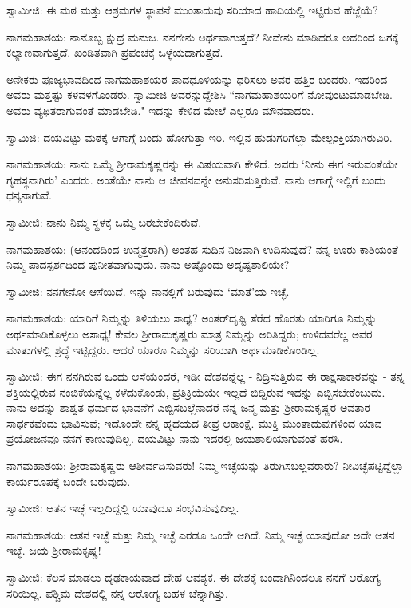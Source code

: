 ಸ್ವಾಮೀಜಿ: ಈ ಮಠ ಮತ್ತು ಆಶ್ರಮಗಳ ಸ್ಥಾಪನೆ ಮುಂತಾದುವು ಸರಿಯಾದ ಹಾದಿಯಲ್ಲಿ ಇಟ್ಟಿರುವ ಹೆಜ್ಜೆಯೆ?

ನಾಗಮಹಾಶಯ: ನಾನೊಬ್ಬ ಕ್ಷುದ್ರ ಮನುಜ. ನನಗೇನು ಅರ್ಥವಾಗುತ್ತದೆ? ನೀವೇನು ಮಾಡಿದರೂ ಅದರಿಂದ ಜಗಕ್ಕೆ ಕಲ್ಯಾಣವಾಗುತ್ತದೆ. ಖಂಡಿತವಾಗಿ ಪ್ರಪಂಚಕ್ಕೆ ಒಳ್ಳೆಯದಾಗುತ್ತದೆ.

ಅನೇಕರು ಪೂಜ್ಯಭಾವದಿಂದ ನಾಗಮಹಾಶಯರ ಪಾದಧೂಳಿಯನ್ನು ಧರಿಸಲು ಅವರ ಹತ್ತಿರ ಬಂದರು. ಇದರಿಂದ ಅವರು ಮತ್ತಷ್ಟು ಕಳವಳಗೊಂಡರು. ಸ್ವಾಮೀಜಿ ಅವರನ್ನುದ್ದೇಶಿಸಿ “ನಾಗಮಹಾಶಯರಿಗೆ ನೋವುಂಟುಮಾಡಬೇಡಿ. ಅವರು ವ್ಯಥಿತರಾಗುವಂತೆ ಮಾಡಬೇಡಿ." ಇದನ್ನು ಕೇಳಿದ ಮೇಲೆ ಎಲ್ಲರೂ ಮೌನವಾದರು.

ಸ್ವಾಮಿಜಿ: ದಯವಿಟ್ಟು ಮಠಕ್ಕೆ ಆಗಾಗ್ಗೆ ಬಂದು ಹೋಗುತ್ತಾ ಇರಿ. ಇಲ್ಲಿನ ಹುಡುಗರಿಗೆಲ್ಲಾ ಮೇಲ್ಪಂಕ್ತಿಯಾಗಿರುವಿರಿ.

ನಾಗಮಹಾಶಯ: ನಾನು ಒಮ್ಮೆ ಶ‍್ರೀರಾಮಕೃಷ್ಣರನ್ನು ಈ ವಿಷಯವಾಗಿ ಕೇಳಿದೆ. ಅವರು ‘ನೀನು ಈಗ ಇರುವಂತೆಯೇ ಗೃಹಸ್ಥನಾಗಿರು’ ಎಂದರು. ಅಂತೆಯೇ ನಾನು ಆ ಜೀವನವನ್ನೇ ಅನುಸರಿಸುತ್ತಿರುವೆ. ನಾನು ಆಗಾಗ್ಗೆ ಇಲ್ಲಿಗೆ ಬಂದು ಧನ್ಯನಾಗುವೆ.

ಸ್ವಾಮೀಜಿ: ನಾನು ನಿಮ್ಮ ಸ್ಥಳಕ್ಕೆ ಒಮ್ಮೆ ಬರಬೇಕೆಂದಿರುವೆ.

ನಾಗಮಹಾಶಯ: (ಆನಂದದಿಂದ ಉನ್ಮತ್ತರಾಗಿ) ಅಂತಹ ಸುದಿನ ನಿಜವಾಗಿ ಉದಿಸುವುದೆ? ನನ್ನ ಊರು ಕಾಶಿಯಂತೆ ನಿಮ್ಮ ಪಾದಸ್ಪರ್ಶದಿಂದ ಪುನೀತವಾಗುವುದು. ನಾನು ಅಷ್ಟೊಂದು ಅದೃಷ್ಟಶಾಲಿಯೇ?

ಸ್ವಾಮೀಜಿ: ನನಗೇನೋ ಆಸೆಯಿದೆ. ಇನ್ನು ನಾನಲ್ಲಿಗೆ ಬರುವುದು ‘ಮಾತೆ’ಯ ಇಚ್ಛೆ.

ನಾಗಮಹಾಶಯ: ಯಾರಿಗೆ ನಿಮ್ಮನ್ನು ತಿಳಿಯಲು ಸಾಧ್ಯ? ಅಂತರ್‌ದೃಷ್ಟಿ ತೆರೆದ ಹೊರತು ಯಾರಿಗೂ ನಿಮ್ಮನ್ನು ಅರ್ಥಮಾಡಿಕೊಳ್ಳಲು ಅಸಾಧ್ಯ! ಕೇವಲ ಶ‍್ರೀರಾಮಕೃಷ್ಣರು ಮಾತ್ರ ನಿಮ್ಮನ್ನು ಅರಿತಿದ್ದರು; ಉಳಿದವರೆಲ್ಲ ಅವರ ಮಾತುಗಳಲ್ಲಿ ಶ್ರದ್ಧೆ ಇಟ್ಟಿದ್ದರು. ಆದರೆ ಯಾರೂ ನಿಮ್ಮನ್ನು ಸರಿಯಾಗಿ ಅರ್ಥಮಾಡಿಕೊಂಡಿಲ್ಲ.

ಸ್ವಾಮೀಜಿ: ಈಗ ನನಗಿರುವ ಒಂದು ಆಸೆಯೆಂದರೆ, ಇಡೀ ದೇಶವನ್ನೆಲ್ಲ - ನಿದ್ರಿಸುತ್ತಿರುವ ಈ ರಾಕ್ಷಸಾಕಾರವನ್ನು - ತನ್ನ ಶಕ್ತಿಯಲ್ಲಿರುವ ನಂಬಿಕೆಯನ್ನೆಲ್ಲ ಕಳೆದುಕೊಂಡು, ಪ್ರತಿಕ್ರಿಯೆಯೇ ಇಲ್ಲದೆ ಬಿದ್ದಿರುವ ಇದನ್ನು ಎಬ್ಬಿಸಬೇಕೆಂಬುದು. ನಾನು ಅದನ್ನು ಶಾಶ್ವತ ಧರ್ಮದ ಭಾವನೆಗೆ ಎಬ್ಬಿಸಬಲ್ಲೆನಾದರೆ ನನ್ನ ಜನ್ಮ ಮತ್ತು ಶ‍್ರೀರಾಮಕೃಷ್ಣರ ಅವತಾರ ಸಾರ್ಥಕವೆಂದು ಭಾವಿಸುವೆ; ಇದೊಂದೇ ನನ್ನ ಹೃದಯದ ತೀವ್ರ ಆಕಾಂಕ್ಷೆ. ಮುಕ್ತಿ ಮುಂತಾದುವುಗಳಿಂದ ಯಾವ ಪ್ರಯೋಜನವೂ ನನಗೆ ಕಾಣುವುದಿಲ್ಲ. ದಯವಿಟ್ಟು ನಾನು ಇದರಲ್ಲಿ ಜಯಶಾಲಿಯಾಗುವಂತೆ ಹರಸಿ.

ನಾಗಮಹಾಶಯ: ಶ‍್ರೀರಾಮಕೃಷ್ಣರು ಆಶೀರ್ವದಿಸುವರು! ನಿಮ್ಮ ಇಚ್ಛೆಯನ್ನು ತಿರುಗಿಸಬಲ್ಲವರಾರು? ನೀವಿಚ್ಛೆಪಟ್ಟಿದ್ದೆಲ್ಲಾ ಕಾರ್ಯರೂಪಕ್ಕೆ ಬಂದೇ ಬರುವುದು.

ಸ್ವಾಮೀಜಿ: ಆತನ ಇಚ್ಛೆ ಇಲ್ಲದಿದ್ದಲ್ಲಿ ಯಾವುದೂ ಸಂಭವಿಸುವುದಿಲ್ಲ.

ನಾಗಮಹಾಶಯ: ಆತನ ಇಚ್ಛೆ ಮತ್ತು ನಿಮ್ಮ ಇಚ್ಛೆ ಎರಡೂ ಒಂದೇ ಆಗಿದೆ. ನಿಮ್ಮ ಇಚ್ಛೆ ಯಾವುದೋ ಅದೇ ಆತನ ಇಚ್ಛೆ. ಜಯ ಶ‍್ರೀರಾಮಕೃಷ್ಣ!

ಸ್ವಾಮೀಜಿ: ಕೆಲಸ ಮಾಡಲು ದೃಢಕಾಯವಾದ ದೇಹ ಆವಶ್ಯಕ. ಈ ದೇಶಕ್ಕೆ ಬಂದಾಗಿನಿಂದಲೂ ನನಗೆ ಆರೋಗ್ಯ ಸರಿಯಿಲ್ಲ. ಪಶ್ಚಿಮ ದೇಶದಲ್ಲಿ ನನ್ನ ಆರೋಗ್ಯ ಬಹಳ ಚೆನ್ನಾಗಿತ್ತು.

